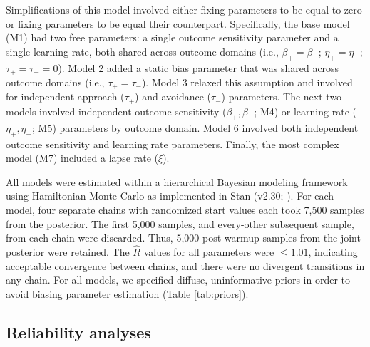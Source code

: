 \documentclass[a4paper,12pt]{article}
\begin{document}
\begin{refsection}[supp]
Simplifications of this model involved either fixing parameters to be equal to zero or fixing parameters to be equal their counterpart. Specifically, the base model (M1) had two free parameters: a single outcome sensitivity parameter and a single learning rate, both shared across outcome domains (i.e., $\beta_+ = \beta_-$; $\eta_+ = \eta_-$; $\tau_+ = \tau_- = 0$). Model 2 added a static bias parameter that was shared across outcome domains (i.e., $\tau_+ = \tau_-$). Model 3 relaxed this assumption and involved for independent approach ($\tau_+$) and avoidance ($\tau_-$) parameters. The next two models involved independent outcome sensitivity ($\beta_+, \beta_-$; M4) or learning rate ($\eta_+, \eta_-$; M5) parameters by outcome domain. Model 6 involved both independent outcome sensitivity and learning rate parameters. Finally, the most complex model (M7) included a lapse rate ($\xi$).

All models were estimated within a hierarchical Bayesian modeling framework using Hamiltonian Monte Carlo as implemented in Stan (v2.30; \cite{carpenter2017stan}). For each model, four separate chains with randomized start values each took 7,500 samples from the posterior. The first 5,000 samples, and every-other subsequent sample, from each chain were discarded. Thus, 5,000 post-warmup samples from the joint posterior were retained. The $\hat{R}$ values for all parameters were $\leq 1.01$, indicating acceptable convergence between chains, and there were no divergent transitions in any chain. For all models, we specified diffuse, uninformative priors in order to avoid biasing parameter estimation (Table \ref{tab:priors}).

\subsection*{Reliability analyses}


\end{refsection}
\end{document}
